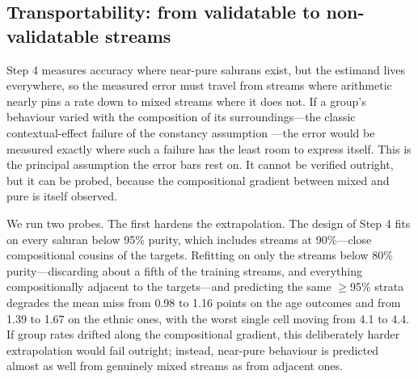 \documentclass[11pt]{article}
\begin{document}
\subsection{Transportability: from validatable to non-validatable streams}
\label{sec:strategy-transport}

Step 4 measures accuracy where near-pure salurans exist, but the estimand lives everywhere, so the measured error must travel from streams where arithmetic nearly pins a rate down to mixed streams where it does not. If a group's behaviour varied with the composition of its surroundings---the classic contextual-effect failure of the constancy assumption \cite{achenshively1995,gelman2001}---the error would be measured exactly where such a failure has the least room to express itself. This is the principal assumption the error bars rest on. It cannot be verified outright, but it can be probed, because the compositional gradient between mixed and pure is itself observed.

We run two probes. The first hardens the extrapolation. The design of Step 4 fits on every saluran below 95\% purity, which includes streams at 90\%---close compositional cousins of the targets. Refitting on only the streams below 80\% purity---discarding about a fifth of the training streams, and everything compositionally adjacent to the targets---and predicting the same $\ge$95\% strata degrades the mean miss from 0.98 to 1.16 points on the age outcomes and from 1.39 to 1.67 on the ethnic ones, with the worst single cell moving from 4.1 to 4.4. If group rates drifted along the compositional gradient, this deliberately harder extrapolation would fail outright; instead, near-pure behaviour is predicted almost as well from genuinely mixed streams as from adjacent ones.
\end{document}
